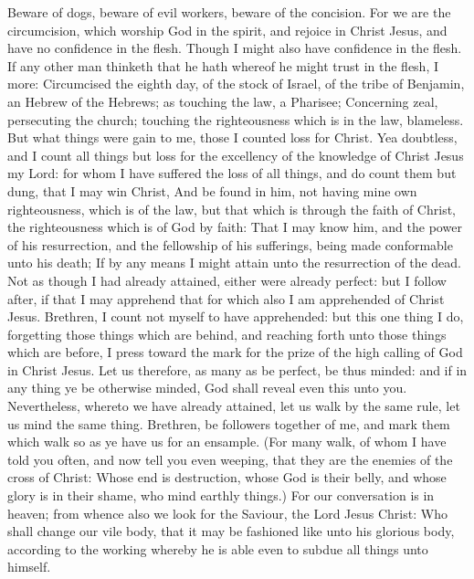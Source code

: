  Beware of dogs, beware of evil workers, beware of the
concision.  For we are the circumcision, which worship God
in the spirit, and rejoice in Christ Jesus, and have no confidence in
the flesh.  Though I might also have confidence in the
flesh. If any other man thinketh that he hath whereof he might trust in
the flesh, I more:  Circumcised the eighth day, of the
stock of Israel, of the tribe of Benjamin, an Hebrew of the Hebrews; as
touching the law, a Pharisee;  Concerning zeal,
persecuting the church; touching the righteousness which is in the law,
blameless.  But what things were gain to me, those I
counted loss for Christ.  Yea doubtless, and I count all
things but loss for the excellency of the knowledge of Christ Jesus my
Lord: for whom I have suffered the loss of all things, and do count them
but dung, that I may win Christ,  And be found in him, not
having mine own righteousness, which is of the law, but that which is
through the faith of Christ, the righteousness which is of God by faith:
 That I may know him, and the power of his resurrection,
and the fellowship of his sufferings, being made conformable unto his
death;  If by any means I might attain unto the
resurrection of the dead.  Not as though I had already
attained, either were already perfect: but I follow after, if that I may
apprehend that for which also I am apprehended of Christ Jesus.
 Brethren, I count not myself to have apprehended: but
this one thing I do, forgetting those things which are behind, and
reaching forth unto those things which are before,  I
press toward the mark for the prize of the high calling of God in Christ
Jesus.  Let us therefore, as many as be perfect, be thus
minded: and if in any thing ye be otherwise minded, God shall reveal
even this unto you.  Nevertheless, whereto we have
already attained, let us walk by the same rule, let us mind the same
thing.  Brethren, be followers together of me, and mark
them which walk so as ye have us for an ensample.  (For
many walk, of whom I have told you often, and now tell you even weeping,
that they are the enemies of the cross of Christ:  Whose
end is destruction, whose God is their belly, and whose glory is in
their shame, who mind earthly things.)  For our
conversation is in heaven; from whence also we look for the Saviour, the
Lord Jesus Christ:  Who shall change our vile body, that
it may be fashioned like unto his glorious body, according to the
working whereby he is able even to subdue all things unto himself.


